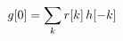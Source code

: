 \documentclass[preview]{standalone}
\begin{document}
\begin{align*}
\special{dvisvgm:raw <g id='unique000'>}g[0]=\sum_k r[k]\,h[-k]\special{dvisvgm:raw </g>}
\end{align*}
\end{document}
